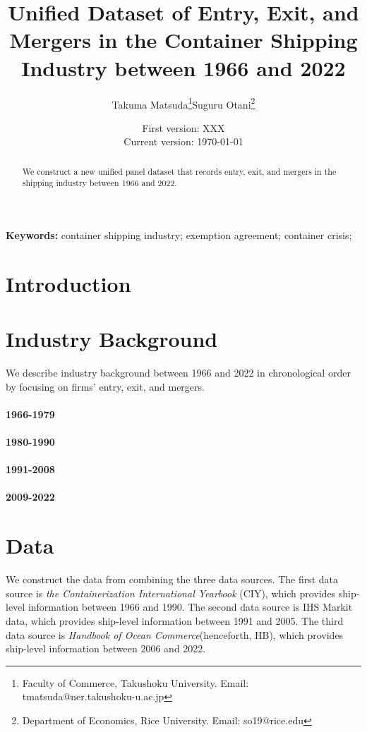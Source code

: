 \documentclass[10pt]{article}
\title{Unified Dataset of Entry, Exit, and Mergers in the Container Shipping Industry between 1966 and 2022}
\author{Takuma Matsuda\thanks{Faculty of Commerce, Takushoku University. Email: tmatsuda@ner.takushoku-u.ac.jp}\quad Suguru Otani\thanks{Department of Economics, Rice University. Email: so19@rice.edu}}
\date{
First version: XXX\\
Current version: \today
}
\begin{document}
\maketitle

\begin{abstract}
We construct a new unified panel dataset that records entry, exit, and mergers in the shipping industry between 1966 and 2022.
\end{abstract} 

\vspace{0.1in}
\noindent\textbf{Keywords:} container shipping industry; exemption agreement; container crisis; 
\vspace{0in}


\section{Introduction}


\section{Industry Background}
We describe industry background between 1966 and 2022 in chronological order by focusing on firms' entry, exit, and mergers. 


\paragraph{1966-1979} 


\cite{matsuda2022unified}

\paragraph{1980-1990}

\cite{matsuda2022unified}

\paragraph{1991-2008}

\paragraph{2009-2022}

\section{Data}

We construct the data from combining the three data sources. 
The first data source is \textit{the Containerization International Yearbook} (CIY), which provides ship-level information between 1966 and 1990.
The second data source is IHS Markit data, which provides ship-level information between 1991 and 2005.
The third data source is \textit{Handbook of Ocean Commerce}(henceforth, HB), which provides ship-level information between 2006 and 2022.
\end{document}
